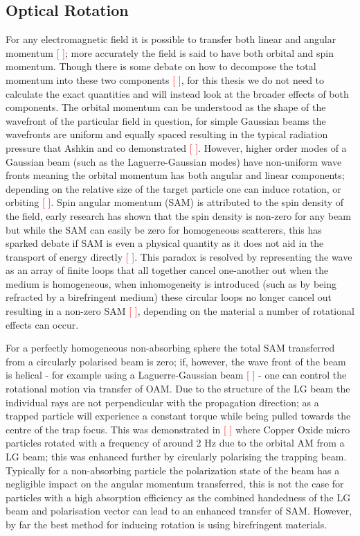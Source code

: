 \subsection{Optical Rotation}
For any electromagnetic field it is possible to transfer both linear and angular momentum \textcolor{red}{[ ]}; more accurately the field is said to have both orbital and spin momentum. Though there is some debate on how to decompose the total momentum into these two components \textcolor{red}{[ ]}, for this thesis we do not need to calculate the exact quantities and will instead look at the broader effects of both components. The orbital momentum can be understood as the shape of the wavefront of the particular field in question, for simple Gaussian beams the wavefronts are uniform and equally spaced resulting in the typical radiation pressure that Ashkin and co demonstrated \textcolor{red}{[ ]}. However, higher order modes of a Gaussian beam (such as the Laguerre-Gaussian modes) have non-uniform wave fronts meaning the orbital momentum has both angular and linear components; depending on the relative size of the target particle one can induce rotation, or orbiting \textcolor{red}{[ ]}. Spin angular momentum (SAM) is attributed to the spin density of the field, early research has shown that the spin density is non-zero for any beam but while the SAM can easily be zero for homogeneous scatterers, this has sparked debate if SAM is even a physical quantity as it does not aid in the transport of energy directly \textcolor{red}{[ ]}. This paradox is resolved by representing the wave as an array of finite loops that all together cancel one-another out when the medium is homogeneous, when inhomogeneity is introduced (such as by being refracted by a birefringent medium) these circular loops no longer cancel out resulting in a non-zero SAM \textcolor{red}{[ ]}, depending on the material a number of rotational effects can occur. 

For a perfectly homogeneous non-absorbing sphere the total SAM transferred from a circularly polarised beam is zero; if, however, the wave front of the beam is helical - for example using a Laguerre-Gaussian beam \textcolor{red}{[ ]} - one can control the rotational motion via transfer of OAM. Due to the structure of the LG beam the individual rays are not perpendicular with the propagation direction; as a trapped particle will experience a constant torque while being pulled towards the centre of the trap focus. This was demonstrated in \textcolor{red}{[ ]} where Copper Oxide micro particles rotated with a frequency of around 2 Hz due to the orbital AM from a LG beam; this was enhanced further by circularly polarising the trapping beam. Typically for a non-absorbing particle the polarization state of the beam has a negligible impact on the angular momentum transferred, this is not the case for particles with a high absorption efficiency as the combined handedness of the LG beam and polarisation vector can lead to an enhanced transfer of SAM. However, by far the best method for inducing rotation is using birefringent materials.

